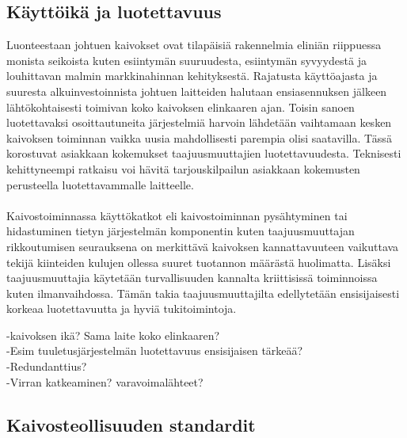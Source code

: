 \documentclass[finnish,12pt,a4paper,pdftex,elec,utf8]{aaltothesis}
\begin{document}

\subsection{Käyttöikä ja luotettavuus}
Luonteestaan johtuen kaivokset ovat tilapäisiä rakennelmia eliniän riippuessa monista seikoista kuten esiintymän suuruudesta, esiintymän syvyydestä ja louhittavan malmin markkinahinnan kehityksestä. Rajatusta käyttöajasta ja suuresta alkuinvestoinnista johtuen laitteiden halutaan ensiasennuksen jälkeen lähtökohtaisesti toimivan koko kaivoksen elinkaaren ajan. Toisin sanoen luotettavaksi osoittautuneita järjestelmiä harvoin lähdetään vaihtamaan kesken kaivoksen toiminnan vaikka uusia mahdollisesti parempia olisi saatavilla. Tässä korostuvat asiakkaan kokemukset taajuusmuuttajien luotettavuudesta. Teknisesti kehittyneempi ratkaisu voi hävitä tarjouskilpailun asiakkaan kokemusten perusteella luotettavammalle laitteelle.
\\\\
Kaivostoiminnassa käyttökatkot eli kaivostoiminnan pysähtyminen tai hidastuminen tietyn järjestelmän komponentin kuten taajuusmuuttajan rikkoutumisen seurauksena on merkittävä kaivoksen kannattavuuteen vaikuttava tekijä kiinteiden kulujen ollessa suuret tuotannon määrästä huolimatta. Lisäksi taajuusmuuttajia käytetään turvallisuuden kannalta kriittisissä toiminnoissa kuten ilmanvaihdossa. Tämän takia taajuusmuuttajilta edellytetään ensisijaisesti korkeaa luotettavuutta ja hyviä tukitoimintoja.




-kaivoksen ikä? Sama laite koko elinkaaren?\\
-Esim tuuletusjärjestelmän luotettavuus ensisijaisen tärkeää?\\
-Redundanttius?\\
-Virran katkeaminen? varavoimalähteet?

\subsection{Kaivosteollisuuden standardit}
\end{document}
